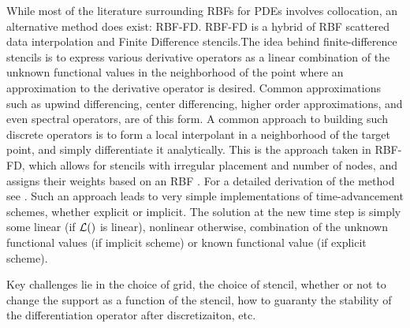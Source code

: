 \documentclass{report}
\begin{document}
{While most of the literature surrounding RBFs for PDEs involves collocation, an alternative method does exist: RBF-FD. RBF-FD is a hybrid of RBF scattered data interpolation and Finite Difference stencils.The idea behind finite-difference stencils is to express various derivative operators as a linear combination of the unknown functional values in the neighborhood of the point where an approximation to the derivative operator is desired. Common approximations such as upwind differencing, center differencing, higher order approximations, and even spectral operators, are of this form. A common approach to building such discrete operators is to form a local interpolant in a neighborhood of the target point, and simply differentiate it analytically. This is the approach taken in RBF-FD,   which  allows for stencils with irregular placement and number of nodes, and assigns their weights based on an RBF \cite{Wright2003}. For a detailed derivation of the method see \cite{Wright2004, Wright2003, WrightFornberg06, Chandhini2007}. Such an approach leads to very simple implementations of time-advancement schemes, whether explicit or implicit. The solution at the new time step is simply some linear (if $\mathcal{L}()$ is linear), nonlinear otherwise, combination of the unknown functional values (if implicit scheme) or known functional value (if explicit scheme). 

Key challenges lie in the choice of grid, the choice of stencil, whether or not to change the support as a function of the stencil, how to guaranty the stability of the differentiation  operator after discretizaiton, etc. 



% 


}
\end{document}
